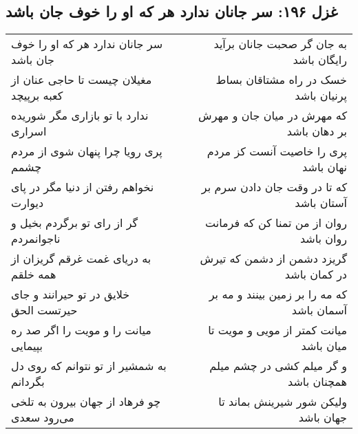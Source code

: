 \begin{center}
\section*{غزل ۱۹۶: سر جانان ندارد هر که او را خوف جان باشد}
\label{sec:196}
\begin{longtable}{l p{0.5cm} r}
سر جانان ندارد هر که او را خوف جان باشد
&&
به جان گر صحبت جانان برآید رایگان باشد
\\
مغیلان چیست تا حاجی عنان از کعبه برپیچد
&&
خسک در راه مشتاقان بساط پرنیان باشد
\\
ندارد با تو بازاری مگر شوریده اسراری
&&
که مهرش در میان جان و مهرش بر دهان باشد
\\
پری رویا چرا پنهان شوی از مردم چشمم
&&
پری را خاصیت آنست کز مردم نهان باشد
\\
نخواهم رفتن از دنیا مگر در پای دیوارت
&&
که تا در وقت جان دادن سرم بر آستان باشد
\\
گر از رای تو برگردم بخیل و ناجوانمردم
&&
روان از من تمنا کن که فرمانت روان باشد
\\
به دریای غمت غرقم گریزان از همه خلقم
&&
گریزد دشمن از دشمن که تیرش در کمان باشد
\\
خلایق در تو حیرانند و جای حیرتست الحق
&&
که مه را بر زمین بینند و مه بر آسمان باشد
\\
میانت را و مویت را اگر صد ره بپیمایی
&&
میانت کمتر از مویی و مویت تا میان باشد
\\
به شمشیر از تو نتوانم که روی دل بگردانم
&&
و گر میلم کشی در چشم میلم همچنان باشد
\\
چو فرهاد از جهان بیرون به تلخی می‌رود سعدی
&&
ولیکن شور شیرینش بماند تا جهان باشد
\\
\end{longtable}
\end{center}
